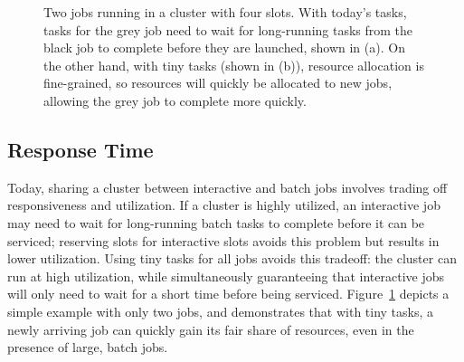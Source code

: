 \begin{figure}[!t]
\centering
{}
\caption{Two jobs running in a cluster with four slots. With today's tasks,
tasks for the grey job need to wait for long-running tasks from the black job to
complete before they are launched, shown in (a).
On the other hand, with tiny tasks (shown in (b)), resource
allocation is fine-grained, so resources will quickly be allocated to new
jobs, allowing the grey job to complete more quickly.}
\vspace{-2ex}
\label{fig:slot_diagram}
\end{figure}



\subsection{Response Time}
Today, sharing a cluster between interactive and batch jobs involves trading off
responsiveness and utilization. If a cluster is highly utilized,
an interactive job may need to wait for long-running batch tasks to
complete before it can be serviced; reserving slots for
interactive slots avoids this problem but results in lower utilization.
Using tiny tasks for all jobs avoids this tradeoff: the cluster can run at
high utilization, while
simultaneously guaranteeing that interactive jobs will only need to wait for
a short time before being serviced. Figure~\ref{fig:slot_diagram} depicts a simple example
with only two jobs, and demonstrates that with tiny tasks, a newly arriving
job can quickly gain its fair share of resources, even in the presence
of large, batch jobs.
